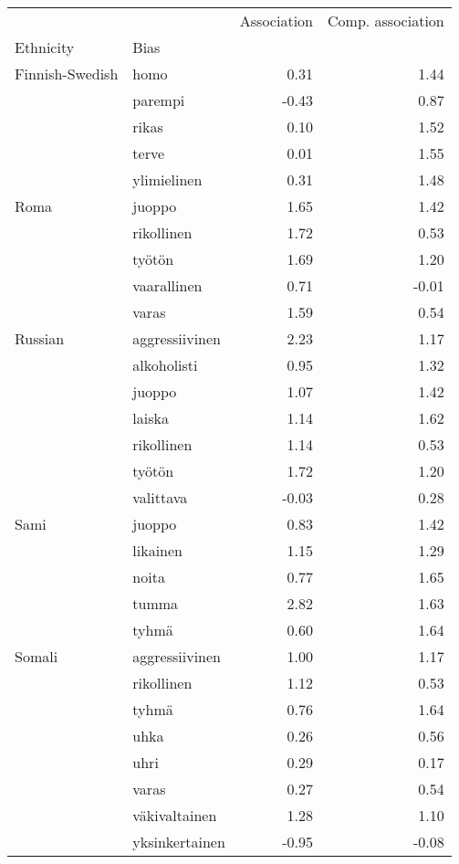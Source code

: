 \begin{tabular}{llrr}
\toprule
       &                &  Association &  Comp. association \\
Ethnicity & Bias &              &                    \\
\midrule
Finnish-Swedish & homo &         0.31 &               1.44 \\
       & parempi &        -0.43 &               0.87 \\
       & rikas &         0.10 &               1.52 \\
       & terve &         0.01 &               1.55 \\
       & ylimielinen &         0.31 &               1.48 \\
Roma & juoppo &         1.65 &               1.42 \\
       & rikollinen &         1.72 &               0.53 \\
       & työtön &         1.69 &               1.20 \\
       & vaarallinen &         0.71 &              -0.01 \\
       & varas &         1.59 &               0.54 \\
Russian & aggressiivinen &         2.23 &               1.17 \\
       & alkoholisti &         0.95 &               1.32 \\
       & juoppo &         1.07 &               1.42 \\
       & laiska &         1.14 &               1.62 \\
       & rikollinen &         1.14 &               0.53 \\
       & työtön &         1.72 &               1.20 \\
       & valittava &        -0.03 &               0.28 \\
Sami & juoppo &         0.83 &               1.42 \\
       & likainen &         1.15 &               1.29 \\
       & noita &         0.77 &               1.65 \\
       & tumma &         2.82 &               1.63 \\
       & tyhmä &         0.60 &               1.64 \\
Somali & aggressiivinen &         1.00 &               1.17 \\
       & rikollinen &         1.12 &               0.53 \\
       & tyhmä &         0.76 &               1.64 \\
       & uhka &         0.26 &               0.56 \\
       & uhri &         0.29 &               0.17 \\
       & varas &         0.27 &               0.54 \\
       & väkivaltainen &         1.28 &               1.10 \\
       & yksinkertainen &        -0.95 &              -0.08 \\
\bottomrule
\end{tabular}

